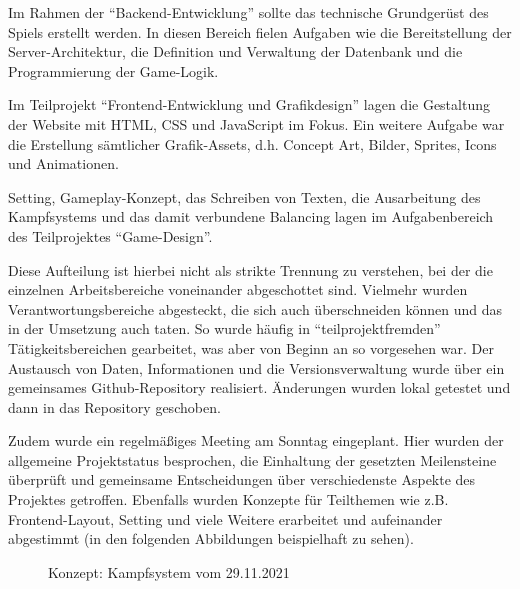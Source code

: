 Im Rahmen der \enquote{Backend-Entwicklung} sollte das technische Grundgerüst des Spiels erstellt werden. In diesen Bereich fielen Aufgaben wie die Bereitstellung der Server-Architektur, die Definition und Verwaltung der Datenbank und die Programmierung der Game-Logik.

Im Teilprojekt \enquote{Frontend-Entwicklung und Grafikdesign} lagen die Gestaltung der Website mit HTML, CSS und JavaScript im Fokus. Ein weitere Aufgabe war die Erstellung sämtlicher Grafik-Assets, d.h. Concept Art, Bilder, Sprites, Icons und Animationen.

Setting, Gameplay-Konzept, das Schreiben von Texten, die Ausarbeitung des Kampfsystems und das damit verbundene Balancing lagen im Aufgabenbereich des Teilprojektes \enquote{Game-Design}.

Diese Aufteilung ist hierbei nicht als strikte Trennung zu verstehen, bei der die einzelnen Arbeitsbereiche voneinander abgeschottet sind. Vielmehr wurden Verantwortungsbereiche abgesteckt, die sich auch überschneiden können und das in der Umsetzung auch taten. So wurde häufig in \enquote{teilprojektfremden} Tätigkeitsbereichen gearbeitet, was aber von Beginn an so vorgesehen war. Der Austausch von Daten, Informationen und die Versionsverwaltung wurde über ein gemeinsames Github-Repository realisiert. Änderungen wurden lokal getestet und dann in das Repository geschoben. 

Zudem wurde ein regelmäßiges Meeting am Sonntag eingeplant. Hier wurden der allgemeine Projektstatus besprochen, die Einhaltung der gesetzten Meilensteine überprüft und gemeinsame Entscheidungen über verschiedenste Aspekte des Projektes getroffen.
Ebenfalls wurden Konzepte für Teilthemen wie z.B. Frontend-Layout, Setting und viele Weitere erarbeitet und aufeinander abgestimmt (in den folgenden Abbildungen beispielhaft zu sehen).


\begin{figure}[H]
    \centering
    \caption{Konzept: Kampfsystem vom 29.11.2021}
    \label{fig:2021-11-29-konzept_kampfsystem}
\end{figure}





